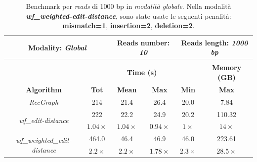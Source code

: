     \begin{table}[h]
        \centering
        \begin{tabular}{|c|c|c|c|c|c|}
            \hline
                \multicolumn{2}{|c|}{\textbf{Modality:} \emph{Global}} & \multicolumn{2}{|c|}{\textbf{Reads number: }   \emph{10}} & \multicolumn{2}{|c|}{\textbf{Reads length:} \emph{1000 bp}} \\
            \hline
                \multicolumn{6}{|c|}{} \\
            \hline
                & \multicolumn{4}{|c|}{\textbf{Time (s)}} & \textbf{Memory (GB)} \\
            \hline
                \textbf{Algorithm} & \textbf{Tot} & \textbf{Mean} & \textbf{Max} & \textbf{Min} & \textbf{Max} \\
            \hline
                \emph{RecGraph} & 214 & 21.4 & 26.4 & 20.0 & 7.84 \\
            \hline
                \multirow{2}{*}{\emph{wf\_edit-distance}} & 222 & 22.2 & 24.9 & 20.2 & 110.32 \\
                & $1.04 \times$ & $1.04 \times$ & $0.94 \times$ & $1 \times$ & $14 \times$ \\
            \hline
            \multirow{2}{*}{\emph{wf\_weighted\_edit-distance}} & 464.0 & 46.4 & 46.9 & 46.0 & 223.61 \\
                & $2.2 \times$ & $2.2  \times$ & $1.78 \times$ & $2.3 \times$ & $28.5 \times$ \\
            \hline
        \end{tabular}
        \caption{Benchmark per \emph{reads} di 1000 bp in \emph{modalità globale}. Nella modalità \textbf{\textit{wf\_weighted-edit-distance}}, sono state usate le seguenti penalità: \textbf{mismatch=1}, \textbf{insertion=2}, \textbf{deletion=2}.}
        \label{tab:benchmark_global_1k}
    \end{table}
    \vspace{20pt}
    
